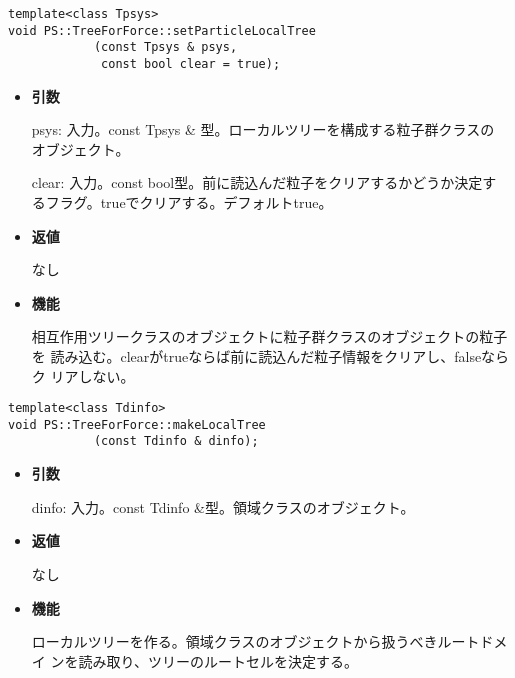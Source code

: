 \begin{screen}
\begin{verbatim}
template<class Tpsys>
void PS::TreeForForce::setParticleLocalTree
            (const Tpsys & psys,
             const bool clear = true);
\end{verbatim}
\end{screen}

\begin{itemize}

\item {\bf 引数}

psys: 入力。const Tpsys \& 型。ローカルツリーを構成する粒子群クラスの
オブジェクト。

clear: 入力。const bool型。前に読込んだ粒子をクリアするかどうか決定す
るフラグ。trueでクリアする。デフォルトtrue。

\item {\bf 返値}

なし

\item {\bf 機能}

相互作用ツリークラスのオブジェクトに粒子群クラスのオブジェクトの粒子を
読み込む。clearがtrueならば前に読込んだ粒子情報をクリアし、falseならク
リアしない。

\end{itemize}


\begin{screen}
\begin{verbatim}
template<class Tdinfo>
void PS::TreeForForce::makeLocalTree
            (const Tdinfo & dinfo);
\end{verbatim}
\end{screen}

\begin{itemize}

\item {\bf 引数}

dinfo: 入力。const Tdinfo \&型。領域クラスのオブジェクト。

\item {\bf 返値}

なし

\item {\bf 機能}

ローカルツリーを作る。領域クラスのオブジェクトから扱うべきルートドメイ
ンを読み取り、ツリーのルートセルを決定する。

\end{itemize}

